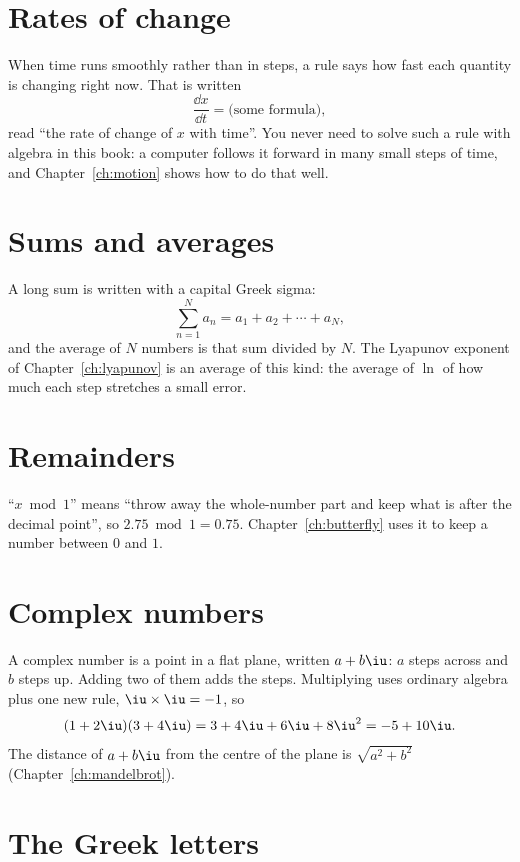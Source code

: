 \section{Rates of change}
\label{sec:appc-rates}

\noindent
When time runs smoothly rather than in steps, a rule says how fast each
quantity is changing right now. That is written
\[ \frac{\dd x}{\dd t} = \text{(some formula)}, \]
read \enquote{the rate of change of $x$ with time}. You never need to solve
such a rule with algebra in this book: a computer follows it forward in
many small steps of time, and Chapter~\ref{ch:motion} shows how to do that
well.

\section{Sums and averages}
\label{sec:appc-sums}

\noindent
A long sum is written with a capital Greek sigma:
\[ \sum_{n=1}^{N} a_{n} = a_{1} + a_{2} + \cdots + a_{N} , \]
and the average of $N$ numbers is that sum divided by $N$. The Lyapunov
exponent of Chapter~\ref{ch:lyapunov} is an average of this kind: the
average of $\ln$ of how much each step stretches a small error.

\section{Remainders}
\label{sec:appc-mod}

\noindent
\enquote{$x \bmod 1$} means \enquote{throw away the whole-number part and keep
what is after the decimal point}, so $\num{2.75} \bmod 1 = \num{0.75}$.
Chapter~\ref{ch:butterfly} uses it to keep a number between $0$ and $1$.

\section{Complex numbers}
\label{sec:appc-complex}

\noindent
A complex number is a point in a flat plane, written $a + b\iu$: $a$ steps
across and $b$ steps up. Adding two of them adds the steps. Multiplying uses
ordinary algebra plus one new rule, $\iu \times \iu = -1$, so
\[ (1 + 2\iu)(3 + 4\iu) = 3 + 4\iu + 6\iu + 8\iu^{2} = -5 + 10\iu . \]
The distance of $a + b\iu$ from the centre of the plane is
$\sqrt{a^{2} + b^{2}}$ (Chapter~\ref{ch:mandelbrot}).

\section{The Greek letters}
\label{sec:appc-greek}

